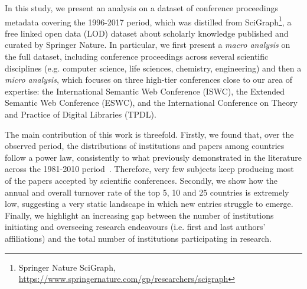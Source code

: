 \documentclass{llncs}
\begin{document}
In this study, we present an analysis on a dataset of conference proceedings metadata covering the 1996-2017 period, which was distilled from SciGraph\footnote{Springer Nature SciGraph, \url{https://www.springernature.com/gp/researchers/scigraph}}, a free linked open data (LOD) dataset about scholarly knowledge published and curated by Springer Nature.
In particular, we first present a \textit{macro analysis} on the full dataset, including conference proceedings across several scientific disciplines (e.g. computer science, life sciences, chemistry, engineering) and then a \textit{micro analysis}, which focuses on three high-tier conferences close to our area of expertise: the International Semantic Web Conference (ISWC), the Extended Semantic Web Conference (ESWC), and the International Conference on Theory and Practice of Digital Libraries (TPDL).

The main contribution of this work is threefold.
Firstly, we found that, over the observed period, the distributions of institutions and papers among countries follow a power law, consistently to what previously demonstrated in the literature across the 1981-2010 period~\cite{may1997,king2004a,egghe2005power,pan2012}. 
Therefore, very few subjects keep producing most of the papers accepted by scientific conferences.
Secondly, we show how the annual and overall turnover rate of the top 5, 10 and 25 countries is extremely low, suggesting a very static landscape in which new entries struggle to emerge.
Finally, we highlight an increasing gap between the number of institutions initiating and overseeing research endeavours (i.e. first and last authors' affiliations) and the total number of institutions participating in research. 

\end{document}
